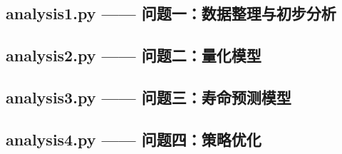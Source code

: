 \documentclass[withoutpreface]{cumcmthesis}
\begin{document}
\begin{appendices}
\subsection{analysis1.py —— 问题一：数据整理与初步分析}


\subsection{analysis2.py —— 问题二：量化模型}


\subsection{analysis3.py —— 问题三：寿命预测模型}


\subsection{analysis4.py —— 问题四：策略优化}


\end{appendices}
\end{document}
